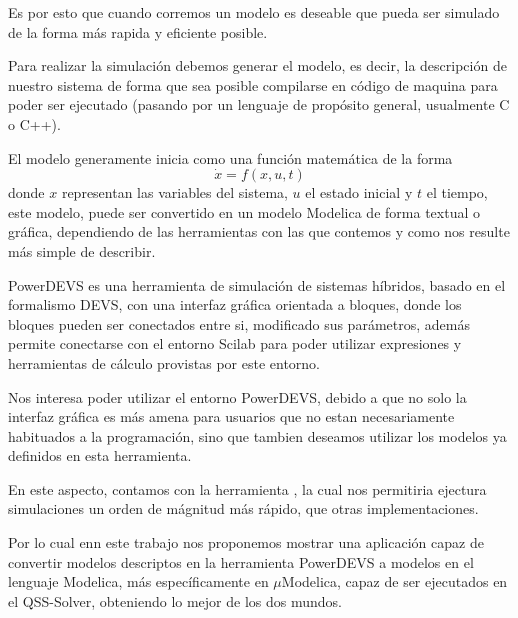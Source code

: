 Es por esto que cuando corremos un modelo es deseable que pueda ser simulado de la forma más rapida y eficiente posible.

Para realizar la simulación debemos generar el modelo, es decir, la descripción de nuestro sistema de forma que sea posible compilarse en código de maquina para poder ser ejecutado (pasando por un lenguaje de propósito general, usualmente C o C++). 

El modelo generamente inicia como una función matemática de la forma 
\begin{equation*}
	\dot{x} = f(x, u, t)
\end{equation*}
donde $x$ representan las variables del sistema, $u$ el estado inicial y $t$ el tiempo, este modelo, puede ser convertido en un modelo Modelica de forma textual o gráfica, dependiendo de las herramientas con las que contemos y como nos resulte más simple de describir.

PowerDEVS\cite{BK11} es una herramienta de simulación de sistemas híbridos, basado en el formalismo DEVS\cite{Zeigler:2000:TMS:580780}, con una interfaz gráfica orientada a bloques, donde los bloques pueden ser conectados entre si, modificado sus parámetros, además permite conectarse con el entorno Scilab para poder utilizar expresiones y herramientas de cálculo provistas por este entorno.

Nos interesa poder utilizar el entorno PowerDEVS, debido a que no solo la interfaz gráfica es más amena para usuarios que no estan necesariamente habituados a la programación, sino que tambien deseamos utilizar los modelos ya definidos en esta herramienta.

En este aspecto, contamos con la herramienta , la cual nos permitiria ejectura simulaciones un orden de mágnitud más rápido, que otras implementaciones.

Por lo cual enn este trabajo nos proponemos mostrar una aplicación capaz de convertir modelos descriptos en la herramienta PowerDEVS\cite{BK11} a modelos en el lenguaje Modelica\cite{Fritzson02modelica--}, más específicamente en $\mu$Modelica\cite{Ber12}, capaz de ser ejecutados en el QSS-Solver, obteniendo lo mejor de los dos mundos.


